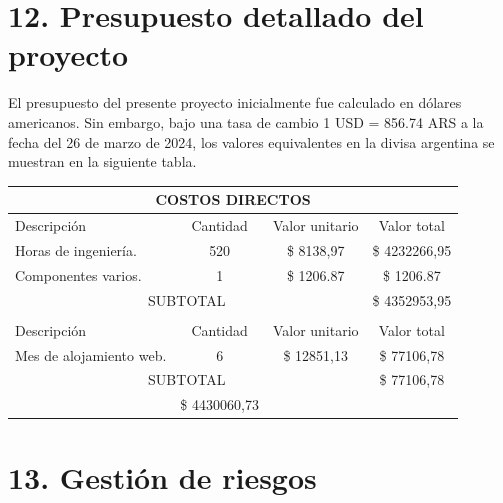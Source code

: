 \documentclass[
11pt, %
codirector, %
]{charter}
\begin{document}
\section{12. Presupuesto detallado del proyecto}
\label{sec:presupuesto}

El presupuesto del presente proyecto inicialmente fue calculado en dólares americanos. Sin embargo, bajo una tasa de cambio 1 USD = 856.74 ARS a la fecha del 26 de marzo de 2024, los valores equivalentes en la divisa argentina se muestran en la siguiente tabla.
\begin{table}[htpb]
\centering
\begin{tabularx}{\linewidth}{@{}|X|c|r|r|@{}}
\hline
\multicolumn{4}{|c|}{\cellcolor[HTML]{C0C0C0}COSTOS DIRECTOS} \\ \hline
\rowcolor[HTML]{C0C0C0} 
Descripción &
  \multicolumn{1}{c|}{\cellcolor[HTML]{C0C0C0}Cantidad} &
  \multicolumn{1}{c|}{\cellcolor[HTML]{C0C0C0}Valor unitario} &
  \multicolumn{1}{c|}{\cellcolor[HTML]{C0C0C0}Valor total} \\ \hline
 Horas de ingeniería. &
  \multicolumn{1}{c|}{520} &
  \multicolumn{1}{c|}{\$ 8138,97} &
  \multicolumn{1}{c|}{\$ 4232266,95} \\ \hline
 Componentes varios. &
  \multicolumn{1}{c|}{1} &
  \multicolumn{1}{c|}{\$ 1206.87} &
  \multicolumn{1}{c|}{\$ 1206.87} \\ \hline
\multicolumn{3}{|c|}{SUBTOTAL} &
  \multicolumn{1}{c|}{\$ 4352953,95} \\ \hline
\rowcolor[HTML]{C0C0C0} 
\multicolumn{4}{|c|}{\cellcolor[HTML]{C0C0C0}COSTOS INDIRECTOS} \\ \hline
\rowcolor[HTML]{C0C0C0} 
Descripción &
  \multicolumn{1}{c|}{\cellcolor[HTML]{C0C0C0}Cantidad} &
  \multicolumn{1}{c|}{\cellcolor[HTML]{C0C0C0}Valor unitario} &
  \multicolumn{1}{c|}{\cellcolor[HTML]{C0C0C0}Valor total} \\ \hline
Mes de alojamiento web. &
  \multicolumn{1}{c|}{6} &
  \multicolumn{1}{c|}{\$ 12851,13} &
  \multicolumn{1}{c|}{\$ 77106,78} \\ \hline
\multicolumn{3}{|c|}{SUBTOTAL} &
  \multicolumn{1}{c|}{\$ 77106,78} \\ \hline
\rowcolor[HTML]{C0C0C0}
\multicolumn{3}{|c|}{TOTAL} & \$ 4430060,73
   \\ \hline
\end{tabularx}%
\end{table}


\section{13. Gestión de riesgos}
\label{sec:riesgos}
\end{document}
